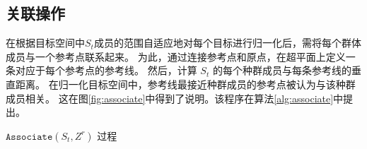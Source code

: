 \subsection{关联操作}
在根据目标空间中$S_t$成员的范围自适应地对每个目标进行归一化后，需将每个群体成员与一个参考点联系起来。%
为此，通过连接参考点和原点，在超平面上定义一条对应于每个参考点的参考线。%
然后，计算 $S_t$ 的每个种群成员与每条参考线的垂直距离。%
在归一化目标空间中，参考线最接近种群成员的参考点被认为与该种群成员相关。%
这在图\ref{fig:associate}中得到了说明。该程序在算法\ref{alg:associate}中提出。
\begin{algorithm}
    \caption{$\mathtt{Associate}(S_t,Z^r)$ 过程}\label{alg:associate}
\end{algorithm}
